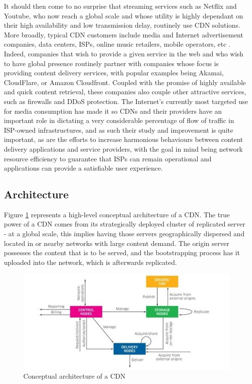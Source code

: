     It should then come to no surprise that streaming services such as Netflix and Youtube, who now reach a global scale and whose utility is highly dependant on their high availability and low transmission delay, routinely use CDN solutions.
    More broadly, typical CDN customers include media and Internet advertisement companies, data centers, ISPs, online music retailers, mobile operators, etc \cite{cdn-survey}.
    Indeed, companies that wish to provide a given service in the web and who wish to have global presence routinely partner with companies whose focus is providing content delivery services, with popular examples being Akamai, CloudFlare, or Amazon Cloudfront.
    Coupled with the promise of highly available and quick content retrieval, these companies also couple other attractive services, such as firewalls and DDoS protection.
    The Internet's currently most targeted use for media consumption has made it so CDNs and their providers have an important role in dictating a very considerable percentage of flow of traffic in ISP-owned infrastructures, and as such their study and improvement is quite important, as are the efforts to increase harmonious behaviours between content delivery applications and service providers, with the goal in mind being network resource efficiency to guarantee that ISPs can remain operational and applications can provide a satisfiable user experience.

\subsection{Architecture}

    Figure \ref{fig:cdn-conceptual-architecture} represents a high-level conceptual architecture of a CDN. The true power of a CDN comes from its strategically deployed cluster of replicated server - at a global scale, this implies having those servers geographically dispersed and located in or nearby networks with large content demand.
    The origin server possesses the content that is to be served, and the bootstrapping process has it uploaded into the network, which is afterwards replicated.


\begin{figure}[!h]
\centering
\includegraphics[scale=8.0]{img/cdn-architecture.jpg}
\caption{Conceptual architecture of a CDN \cite{cdn-survey}}
\label{fig:cdn-conceptual-architecture}
\end{figure}

